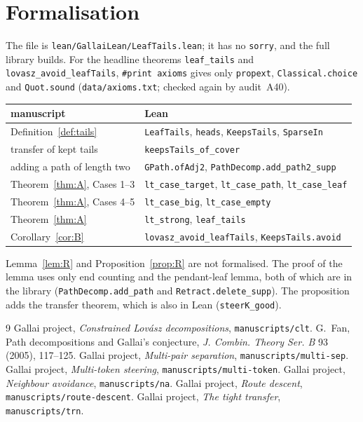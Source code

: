 \documentclass[11pt]{amsart}
\theoremstyle{definition}
\begin{document}
\section{Formalisation}\label{sec:lean}

The file is \texttt{lean/GallaiLean/LeafTails.lean}; it has no \texttt{sorry}, and the full library
builds. For the headline theorems \texttt{leaf\_tails} and \texttt{lovasz\_avoid\_leafTails},
\texttt{\#print axioms} gives only \texttt{propext}, \texttt{Classical.choice} and
\texttt{Quot.sound} (\texttt{data/axioms.txt}; checked again by audit~A40).

\begin{center}\footnotesize
\begin{tabular}{@{}ll@{}}
\toprule
manuscript & Lean\\
\midrule
Definition~\ref{def:tails} & \texttt{LeafTails}, \texttt{heads}, \texttt{KeepsTails}, \texttt{SparseIn}\\
transfer of kept tails & \texttt{keepsTails\_of\_cover}\\
adding a path of length two & \texttt{GPath.ofAdj2}, \texttt{PathDecomp.add\_path2\_supp}\\
Theorem~\ref{thm:A}, Cases 1--3 & \texttt{lt\_case\_target}, \texttt{lt\_case\_path}, \texttt{lt\_case\_leaf}\\
Theorem~\ref{thm:A}, Cases 4--5 & \texttt{lt\_case\_big}, \texttt{lt\_case\_empty}\\
Theorem~\ref{thm:A} & \texttt{lt\_strong}, \texttt{leaf\_tails}\\
Corollary~\ref{cor:B} & \texttt{lovasz\_avoid\_leafTails}, \texttt{KeepsTails.avoid}\\
\bottomrule
\end{tabular}
\end{center}
Lemma~\ref{lem:R} and Proposition~\ref{prop:R} are not formalised. The proof of the lemma uses
only end counting and the pendant-leaf lemma, both of which are in the library
(\texttt{PathDecomp.add\_path} and \texttt{Retract.delete\_supp}). The proposition adds the
transfer theorem, which is also in Lean (\texttt{steerK\_good}).

\begin{thebibliography}{9}
 Gallai project, \emph{Constrained Lov\'asz decompositions}, \texttt{manuscripts/clt}.
 G.~Fan, Path decompositions and Gallai's conjecture, \emph{J. Combin. Theory Ser. B}
93 (2005), 117--125.
 Gallai project, \emph{Multi-pair separation}, \texttt{manuscripts/multi-sep}.
 Gallai project, \emph{Multi-token steering}, \texttt{manuscripts/multi-token}.
 Gallai project, \emph{Neighbour avoidance}, \texttt{manuscripts/na}.
 Gallai project, \emph{Route descent}, \texttt{manuscripts/route-descent}.
 Gallai project, \emph{The tight transfer}, \texttt{manuscripts/trn}.
\end{thebibliography}
\end{document}
